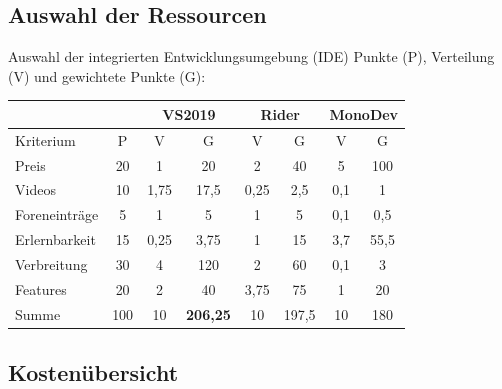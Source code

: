 \documentclass[toc]{beamer}
\begin{document}
\subsection{Auswahl der Ressourcen}
    \begin{frame}{Auswahl der integrierten Entwicklungsumgebung (IDE)}
    Punkte (P), Verteilung (V) und gewichtete Punkte (G):
        \begin{table}[ht]

		\begin{tabular}{|| l | c | c | c | c | c | c | c ||}
	    \hline	
	    
	    \multicolumn{2}{||c|}{} & \multicolumn{2}{|c|}{VS2019}  & \multicolumn{2}{|c|}{Rider}  & \multicolumn{2}{|c||}{MonoDev}   \\
	    \hline
	    Kriterium & P & V & G  & V & G & V & G \\
	    \hline
	    Preis & 20 & 1 & 20 & 2 & 40 & 5 & 100 \\
	    Videos & 10 & 1,75 & 17,5 & 0,25 & 2,5 & 0,1 & 1 \\
	    Foreneinträge & 5 & 1 & 5 & 1 & 5 & 0,1 & 0,5 \\
	    Erlernbarkeit & 15 & 0,25 & 3,75 & 1 & 15 & 3,7 & 55,5 \\
	    Verbreitung & 30 & 4 & 120 & 2 & 60 & 0,1 & 3 \\
	    Features & 20 & 2 & 40 & 3,75 & 75 & 1 & 20 \\
	    \hline
	    Summe & 100 & 10 & \textbf{206,25} & 10 & 197,5 & 10 & 180 \\
	    
		\hline
		
		
	
		
			\end{tabular}
			\end{table}
    \end{frame}

\subsection{Kostenübersicht}
    
\end{document}

